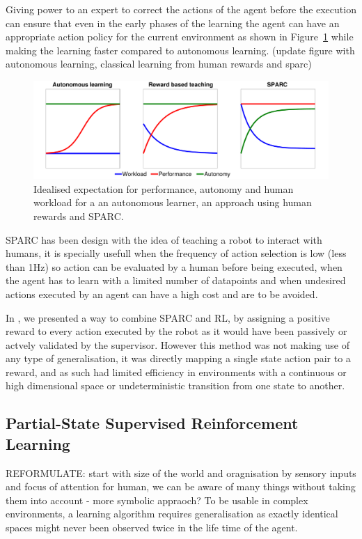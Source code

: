 \documentclass[letterpaper]{article} %
\begin{document}
Giving power to an expert to correct the actions of the agent before the
execution can ensure that even in the early phases of the learning the agent can
have an appropriate action policy for the current environment as shown in
Figure~\ref{fig:comparison} while making the learning faster compared to
autonomous learning. (update figure with autonomous learning, classical learning from human rewards
and sparc)

\begin{figure}
    \centering
    \includegraphics[width=0.9\linewidth]{./fig/motivation.pdf}
    \caption{Idealised expectation for performance, autonomy and human workload for a
    an autonomous learner, an approach using human rewards and SPARC.}
    \label{fig:comparison}
\end{figure}

SPARC has been design with the idea of teaching a robot to interact with humans,
it is specially usefull when the frequency of action selection is low (less than
1Hz) so action can be evaluated by a human before being executed, when the agent
has to learn with a limited number of datapoints and when
undesired actions executed by an agent can have a high cost and are to be
avoided. 

In \cite{senft2017supervised}, we presented a way to combine SPARC and RL, by
assigning a positive reward to every action executed by the robot as it would
have been passively or actvely validated by the supervisor. However this method
was not making use of any type of generalisation, it was directly mapping a
single state action pair to a reward, and as such had limited efficiency in
environments with a continuous or high dimensional space or undeterministic
transition from one state to another.

\subsection{Partial-State Supervised Reinforcement Learning}

REFORMULATE: start with size of the world and oragnisation by sensory inputs and
focus of attention for human, we can be aware of many things without taking them
into account - more symbolic appraoch?
To be usable in complex environments, a
learning algorithm requires generalisation as exactly identical spaces might
never been observed twice in the life time of the agent.
\end{document}

